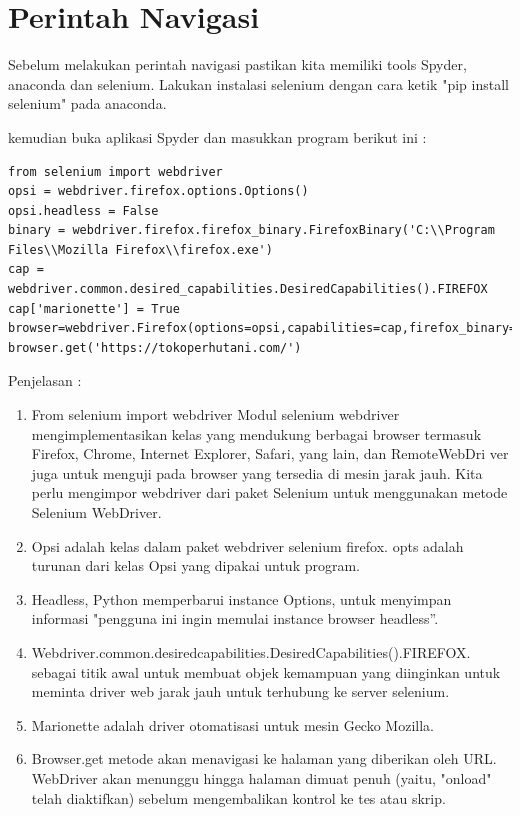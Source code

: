 \section{Perintah Navigasi}
Sebelum melakukan perintah navigasi pastikan kita memiliki tools Spyder, anaconda dan selenium. Lakukan instalasi selenium dengan cara ketik "pip install selenium" pada anaconda.

kemudian buka aplikasi Spyder dan masukkan program berikut ini :
\begin{verbatim}
from selenium import webdriver
opsi = webdriver.firefox.options.Options()
opsi.headless = False
binary = webdriver.firefox.firefox_binary.FirefoxBinary('C:\\Program Files\\Mozilla Firefox\\firefox.exe')
cap = webdriver.common.desired_capabilities.DesiredCapabilities().FIREFOX
cap['marionette'] = True
browser=webdriver.Firefox(options=opsi,capabilities=cap,firefox_binary=binary)
browser.get('https://tokoperhutani.com/')
\end{verbatim}

Penjelasan : 
\begin{enumerate}
    \item From selenium import webdriver Modul selenium webdriver mengimplementasikan kelas yang mendukung berbagai browser termasuk Firefox, Chrome, Internet Explorer, Safari, yang lain, dan RemoteWebDri	ver juga untuk menguji pada browser yang tersedia di mesin jarak jauh. Kita perlu mengimpor webdriver dari paket Selenium untuk menggunakan metode Selenium WebDriver.
    \item Opsi adalah kelas dalam paket webdriver selenium firefox. opts adalah turunan dari kelas Opsi yang dipakai untuk program.
    \item Headless, Python memperbarui instance Options, untuk menyimpan informasi "pengguna ini ingin memulai instance browser headless”.
    \item Webdriver.common.desiredcapabilities.DesiredCapabilities().FIREFOX.   sebagai titik awal untuk membuat objek kemampuan yang diinginkan untuk meminta driver web jarak jauh untuk terhubung ke server selenium.  
    \item Marionette adalah driver otomatisasi untuk mesin Gecko Mozilla.
    \item Browser.get metode akan menavigasi ke halaman yang diberikan oleh URL. WebDriver akan menunggu hingga halaman dimuat penuh (yaitu, "onload" telah diaktifkan) sebelum mengembalikan kontrol ke tes atau skrip.
\end{enumerate}

